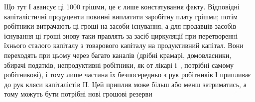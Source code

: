 Що тут І авансує ці 1000 грішми, це є лише констатування
факту. Відповідні капіталістичні продуценти повинні виплатити заробітну
плату грішми; потім робітники витрачають ці гроші на засоби
існування, а для продавців засобів існування ці гроші знову таки правлять
за засіб циркуляції при перетворенні їхнього сталого капіталу
з товарового капіталу на продуктивний капітал. Вони переходять при
цьому через багато каналів (дрібні крамарі, домовласники, збирачі
податків, непродуктивні робітники, як от лікарі і~, потрібні самому
робітникові), і тому лише частина їх безпосередньо з рук робітників І
припливає до рук кляси капіталістів II. Цей приплив може більш або
менш затриматись, а тому можуть бути потрібні нові грошові резерви
\parbreak{}  %
